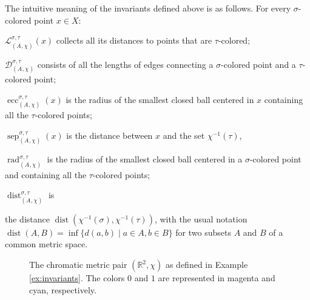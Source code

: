 \documentclass[8pt,a4paper,oneside,english,english]{article}
\theoremstyle{plain}
\theoremstyle
{plain}
\theoremstyle{definition}
\newcommand{\MP}[1]{(A_{#1},\chi_{#1})}
\DeclareMathOperator{\dist}{dist}
\DeclareMathOperator{\ecc}{ecc}
\DeclareMathOperator{\rad}{rad}
\DeclareMathOperator{\sep}{sep}
\begin{document}
The intuitive meaning of the invariants defined above is as follows.
For every $\sigma$-colored point $x\in X$:
\begin{compactenum}[-]
    \item $\mathcal L_{\MP{}}^{\sigma,\tau}(x)$ collects all its distances to points that are $\tau$-colored;
    \item $\mathcal D^{\sigma,\tau}_{\MP{}}$ consists of all the lengths of edges connecting a $\sigma$-colored point and a $\tau$-colored point;
    \item $\ecc_{\MP{}}^{\sigma,\tau}(x)$ is the radius of the smallest closed 
    ball centered in $x$ containing all the $\tau$-colored points;
    \item $\sep_{\MP{}}^{\sigma,\tau}(x)$ is the distance between $x$ and the set $\chi^{-1}(\tau)$,
    \item $\rad_{\MP{}}^{\sigma,\tau}$ is the radius of the smallest closed ball centered in a $\sigma$-colored point and containing all the $\tau$-colored points;
    \item $\dist_{\MP{}}^{\sigma,\tau}$ is
    
    the distance $\dist(\chi^{-1}(\sigma),\chi^{-1}(\tau))$, with the usual notation $\dist(A,B)=\inf\{d(a,b)\mid a\in A,b\in B\}$ for two subsets $A$ and $B$ of a common metric space.
\end{compactenum}



\begin{figure}[!h]
    \centering
    \caption{\footnotesize The chromatic metric pair $(\mathbb R^2, \chi)$ as defined in Example \ref{ex:invariants}. The colors $0$ and $1$ are represented in magenta and cyan, respectively.}
    \label{fig:invariants}
\end{figure}
\end{document}
